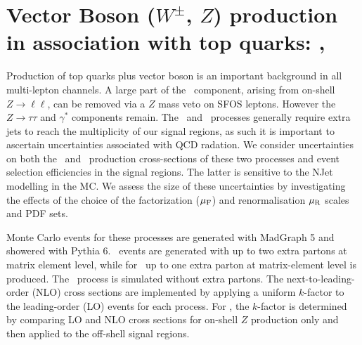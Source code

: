 \begin{table}
{
\label{table:background_summary}%
}
\end{table} 


\section{Vector Boson ($W^{\pm}$, $Z$) production in association with top quarks: \ttV, \tZ}  
\label{section:ttV}
Production of top quarks plus vector boson is an important background in all multi-lepton channels.   A large part of the \ttV\ component, arising from on-shell $Z\to\ell\ell$, can be removed via a $Z$ mass veto on SFOS leptons.  However the $Z \to \tau\tau$ and $\gamma^*$ components remain. The \ttW\ and \tZ\ processes generally require extra jets to reach the multiplicity of our signal regions, as such it is important to ascertain uncertainties associated with QCD radation. We consider uncertainties on both the \ttW\ and \ttZ\ production cross-sections of these two processes and event selection efficiencies in the signal regions. The latter is sensitive to the NJet modelling in the MC. We assess the size of these uncertainties by investigating the effects of the choice of the factorization ($\mu_{\rm F}$) and renormalisation $\mu_{\rm R}$ scales and PDF sets. 

Monte Carlo events for these processes are generated with MadGraph 5 and showered with Pythia 6.  \ttW\ events are generated with up to two extra partons at matrix element level, while for \ttZ\ up to one extra parton at matrix-element level is produced.  The \tZ\ process is simulated without extra partons.  The next-to-leading-order (NLO) cross sections are implemented by applying a uniform $k$-factor to the leading-order (LO) events for each process.  For \ttZ, the $k$-factor is determined by comparing LO and NLO cross sections for on-shell $Z$ production only and then applied to the off-shell signal regions.  

